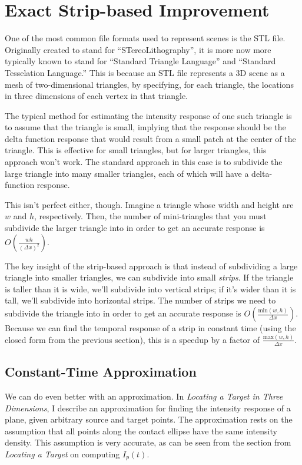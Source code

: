 \documentclass[11pt]{article}
\begin{document}
\section{Exact Strip-based Improvement}

One of the most common file formats used to represent scenes is the STL file. Originally created to stand for ``STereoLithography'', it is more now more typically known to stand for ``Standard Triangle Language'' and ``Standard Tesselation Language.'' This is because an STL file represents a 3D scene as a mesh of two-dimensional triangles, by specifying, for each triangle, the locations in three dimensions of each vertex in that triangle.

The typical method for estimating the intensity response of one such triangle is to assume that the triangle is small, implying that the response should be the delta function response that would result from a small patch at the center of the triangle. This is effective for small triangles, but for larger triangles, this approach won't work. The standard approach in this case is to subdivide the large triangle into many smaller triangles, each of which will have a delta-function response.

This isn't perfect either, though. Imagine a triangle whose width and height are $w$ and $h$, respectively. Then, the number of mini-triangles that you must subdivide the larger triangle into in order to get an accurate response is $O(\frac{wh}{(\Delta x)^2})$. 

The key insight of the strip-based approach is that instead of subdividing a large triangle into smaller triangles, we can subdivide into small \emph{strips}. If the triangle is taller than it is wide, we'll subdivide into vertical strips; if it's wider than it is tall, we'll subdivide into horizontal strips. The number of strips we need to subdivide the triangle into in order to get an accurate response is $O(\frac{\mathrm{min}(w, h)}{\Delta x})$. Because we can find the temporal response of a strip in constant time (using the closed form from the previous section), this is a speedup by a factor of $\frac{\mathrm{max}(w, h)}{\Delta x}$.

\subsection{Constant-Time Approximation}

We can do even better with an approximation. In \emph{Locating a Target in Three Dimensions}, I describe an approximation for finding the intensity response of a plane, given arbitrary source and target points. The approximation rests on the assumption that all points along the contact ellipse have the same intensity density. This assumption is very accurate, as can be seen from the section from \emph{Locating a Target} on computing $I_p(t)$.
\end{document}
